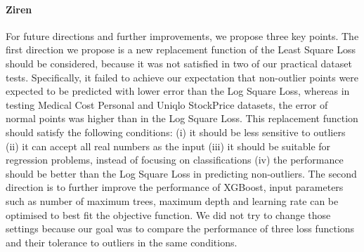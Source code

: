 \documentclass[runningheads]{llncs}
\begin{document}
\paragraph{Ziren}For future directions and further improvements, we propose three key points. The first direction we propose is a new replacement function of the Least Square Loss should be considered, because it was not satisfied in two of our practical dataset tests. Specifically, it failed to achieve our expectation that non-outlier points were expected to be predicted with lower error than the Log Square Loss, whereas in testing Medical Cost Personal and Uniqlo StockPrice datasets, the error of normal points was higher than in the Log Square Loss. This replacement function should satisfy the following conditions: (i) it should be less sensitive to outliers (ii) it can accept all real numbers as the input (iii) it should be suitable for regression problems, instead of focusing on classifications (iv) the performance should be better than the Log Square Loss in predicting non-outliers. The second direction is to further improve the performance of XGBoost, input parameters such as number of maximum trees, maximum depth and learning rate can be optimised to best fit the objective function. We did not try to change those settings because our goal was to compare the performance of three loss functions and their tolerance to outliers in the same conditions. 




%
%

%
%
%
% 
% 
%
\end{document}
